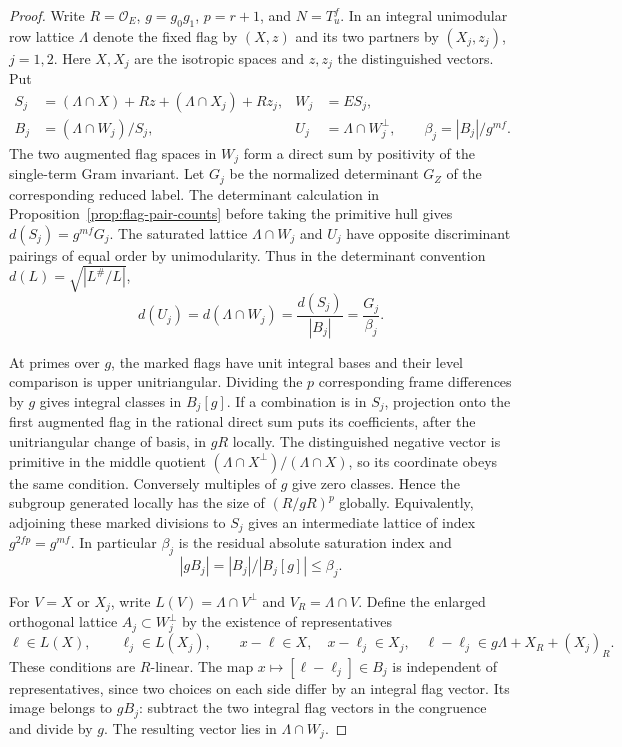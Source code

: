 \begin{proof}
Write \(R=\mathcal O_E\), \(g=g_0g_1\), \(p=r+1\), and
\(N=T_u^f\). In an integral unimodular row lattice \(\Lambda\)
denote the fixed flag by \((X,z)\) and its two partners by
\((X_j,z_j)\), \(j=1,2\). Here \(X,X_j\) are the isotropic spaces
and \(z,z_j\) the distinguished vectors. Put
\[
 \begin{aligned}
 S_j&=(\Lambda\cap X)+Rz+(\Lambda\cap X_j)+Rz_j,&
 W_j&=E S_j,\\
 B_j&=(\Lambda\cap W_j)/S_j,&
 U_j&=\Lambda\cap W_j^\perp,\qquad
 \beta_j=|B_j|/g^{mf}.
 \end{aligned}
\]
The two augmented flag spaces in \(W_j\) form a direct sum by
positivity of the single-term Gram invariant. Let \(G_j\) be the
normalized determinant \(G_Z\) of the corresponding reduced label.
The determinant calculation in Proposition~\ref{prop:flag-pair-counts}
before taking the primitive hull gives \(d(S_j)=g^{mf}G_j\).
The saturated lattice \(\Lambda\cap W_j\) and \(U_j\) have
opposite discriminant pairings of equal order by unimodularity.
Thus in the determinant convention \(d(L)=\sqrt{|L^\#/L|}\),
\[
   d(U_j)=d(\Lambda\cap W_j)
          =\frac{d(S_j)}{|B_j|}=\frac{G_j}{\beta_j}.
\]

At primes over \(g\), the marked flags have unit integral bases and
their level comparison is upper unitriangular. Dividing the \(p\)
corresponding frame differences by \(g\) gives integral classes
in \(B_j[g]\). If a combination is in \(S_j\), projection onto the
first augmented flag in the rational direct sum puts its coefficients,
after the unitriangular change of basis, in \(gR\) locally.
The distinguished negative vector is primitive in the middle
quotient \((\Lambda\cap X^\perp)/(\Lambda\cap X)\), so its
coordinate obeys the same condition.
Conversely multiples of \(g\) give zero classes. Hence the subgroup
generated locally has the size of \((R/gR)^p\) globally. Equivalently,
adjoining these marked divisions to \(S_j\) gives an intermediate
lattice of index \(g^{2fp}=g^{mf}\). In particular \(\beta_j\) is
the residual absolute saturation index and
\[
       |gB_j|=|B_j|/|B_j[g]|\le\beta_j .
\]

For \(V=X\) or \(X_j\), write \(L(V)=\Lambda\cap V^\perp\) and
\(V_R=\Lambda\cap V\). Define the enlarged orthogonal lattice
\(A_j\subset W_j^\perp\) by the existence of representatives
\[
 \ell\in L(X),\qquad \ell_j\in L(X_j),\qquad
 x-\ell\in X,\quad x-\ell_j\in X_j,\quad
 \ell-\ell_j\in g\Lambda+X_R+(X_j)_R .
\]
These conditions are \(R\)-linear. The map
\(x\mapsto[\ell-\ell_j]\in B_j\) is independent of representatives,
since two choices on each side differ by an integral flag vector.
Its image belongs to \(gB_j\): subtract the two integral flag
vectors in the congruence and divide by \(g\). The resulting vector
lies in \(\Lambda\cap W_j\).


\end{proof}
